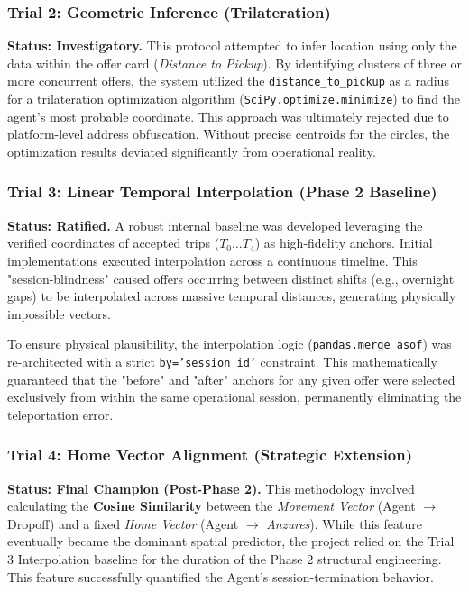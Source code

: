 \subsubsection{Trial 2: Geometric Inference (Trilateration)}
\textbf{Status: Investigatory.} This protocol attempted to infer location using only the data within the offer card (\textit{Distance to Pickup}). By identifying clusters of three or more concurrent offers, the system utilized the \texttt{distance\_to\_pickup} as a radius for a trilateration optimization algorithm (\texttt{SciPy.optimize.minimize}) to find the agent's most probable coordinate. This approach was ultimately rejected due to platform-level address obfuscation. Without precise centroids for the circles, the optimization results deviated significantly from operational reality.

\subsubsection{Trial 3: Linear Temporal Interpolation (Phase 2 Baseline)}
\textbf{Status: Ratified.} A robust internal baseline was developed leveraging the verified coordinates of accepted trips ($T_0 \dots T_4$) as high-fidelity anchors. Initial implementations executed interpolation across a continuous timeline. This "session-blindness" caused offers occurring between distinct shifts (e.g., overnight gaps) to be interpolated across massive temporal distances, generating physically impossible vectors.

\medskip
To ensure physical plausibility, the interpolation logic (\texttt{pandas.merge\_asof}) was re-architected with a strict \texttt{by='session\_id'} constraint. This mathematically guaranteed that the "before" and "after" anchors for any given offer were selected exclusively from within the same operational session, permanently eliminating the teleportation error.

\subsubsection{Trial 4: Home Vector Alignment (Strategic Extension)}
\textbf{Status: Final Champion (Post-Phase 2).} This methodology involved calculating the \textbf{Cosine Similarity} between the \textit{Movement Vector} (Agent $\to$ Dropoff) and a fixed \textit{Home Vector} (Agent $\to$ \textit{Anzures}). While this feature eventually became the dominant spatial predictor, the project relied on the Trial 3 Interpolation baseline for the duration of the Phase 2 structural engineering. This feature successfully quantified the Agent’s session-termination behavior.



